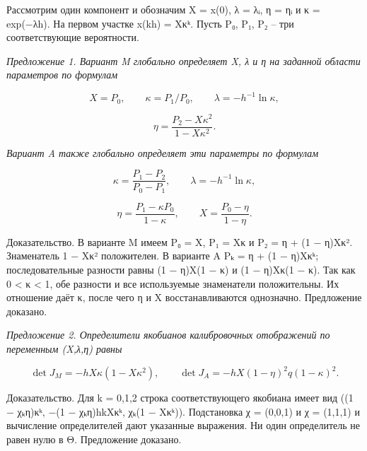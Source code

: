 \documentclass[11pt,a4paper]{article}
\begin{document}
Рассмотрим один компонент и обозначим X = x(0), λ = λᵢ, η = ηᵢ и κ = exp(−λh). На первом участке x(kh) = Xκᵏ. Пусть P₀, P₁, P₂ – три соответствующие вероятности.\par

\textit{Предложение 1. Вариант M глобально определяет X, λ и η на заданной области параметров по формулам}\par

\begin{equation}X=P_0,\qquad κ=P_1/P_0,\qquad \lambda=-h^{-1}\ln κ,\end{equation}

\begin{equation}\eta=\frac{P_2-Xκ^2}{1-Xκ^2}.\end{equation}

\textit{Вариант A также глобально определяет эти параметры по формулам}\par

\begin{equation}κ=\frac{P_1-P_2}{P_0-P_1},\qquad \lambda=-h^{-1}\ln κ,\end{equation}

\begin{equation}\eta=\frac{P_1-κP_0}{1-κ},\qquad X=\frac{P_0-\eta}{1-\eta}.\end{equation}

Доказательство. В варианте M имеем P₀ = X, P₁ = Xκ и P₂ = η + (1 − η)Xκ². Знаменатель 1 − Xκ² положителен. В варианте A Pₖ = η + (1 − η)Xκᵏ; последовательные разности равны (1 − η)X(1 − κ) и (1 − η)Xκ(1 − κ). Так как 0 < κ < 1, обе разности и все используемые знаменатели положительны. Их отношение даёт κ, после чего η и X восстанавливаются однозначно. Предложение доказано.\par

\textit{Предложение 2. Определители якобианов калибровочных отображений по переменным (X,λ,η) равны}\par

\begin{equation}\det J_M=-hXκ(1-Xκ^2),\qquad \det J_A=-hX(1-\eta)^2q(1-κ)^2.\end{equation}

Доказательство. Для k = 0,1,2 строка соответствующего якобиана имеет вид ((1 − χₖη)κᵏ, −(1 − χₖη)hkXκᵏ, χₖ(1 − Xκᵏ)). Подстановка χ = (0,0,1) и χ = (1,1,1) и вычисление определителей дают указанные выражения. Ни один определитель не равен нулю в Θ. Предложение доказано.\par
\end{document}
